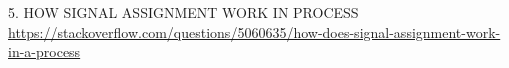 \documentclass[UTF8]{article}
\begin{document}
5. HOW SIGNAL ASSIGNMENT WORK IN PROCESS \\\url{https://stackoverflow.com/questions/5060635/how-does-signal-assignment-work-in-a-process}










\end{document}
